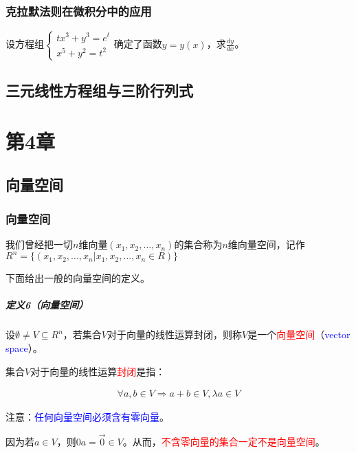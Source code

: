 \documentclass[UTF8]{ctexbook}
\begin{document}
\subsection{克拉默法则在微积分中的应用}

设方程组$\begin{cases}
tx^{3}+y^{3}=e^{t}\\
x^{5}+y^{2}=t^{2}
\end{cases}$确定了函数$y=y(x)$，求$\frac{dy}{dx}$。

\section{三元线性方程组与三阶行列式}

\chapter{第4章}

\section{向量空间}

\subsection{向量空间}

我们曾经把一切$n$维向量$(x_{1},x_{2},\dots,x_{n})$的集合称为$n$维向量空间，记作$R^{n}=\{ (x_{1},x_{2},\dots,x_{n} | x_{1},x_{2},\dots,x_{n} \in R)\}$

下面给出一般的向量空间的定义。

\paragraph{定义6（向量空间）} 设$\emptyset \neq V \subseteq R^{n}$，若集合$V$对于向量的线性运算封闭，则称$V$是一个\textcolor{red}{向量空间}（\textcolor{blue}{vector space}）。

集合$V$对于向量的线性运算\textcolor{red}{封闭}是指：

\begin{equation}
\begin{aligned}
\forall a,b \in V \Rightarrow a+b \in V, \lambda a \in V
\end{aligned}
\end{equation}

注意：\textcolor{blue}{任何向量空间必须含有零向量}。

因为若$a \in V$，则$0a=\vec{0} \in V$。从而，\textcolor{red}{不含零向量的集合一定不是向量空间}。
\end{document}
